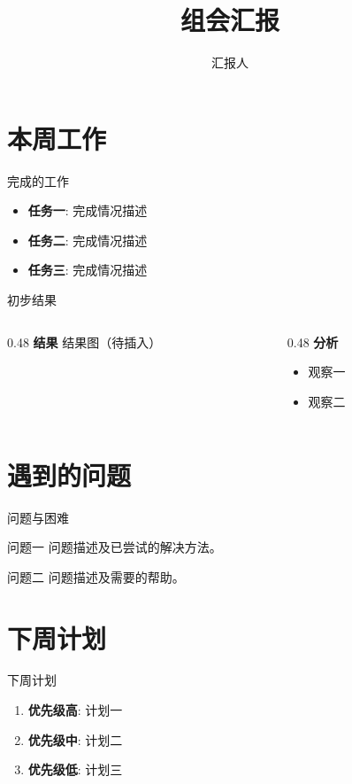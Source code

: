 \documentclass[
    aspectratio=169,
    fontset=windows,
]{ctexbeamer}
\title{组会汇报}
\author{汇报人}
\begin{document}
\maketitle

\section{本周工作}

\begin{frame}{完成的工作}
  \begin{itemize}
    \item \textbf{任务一}: 完成情况描述
    \item \textbf{任务二}: 完成情况描述
    \item \textbf{任务三}: 完成情况描述
  \end{itemize}
\end{frame}

\begin{frame}{初步结果}
  \begin{columns}[T]
    \begin{column}{0.48\textwidth}
      \textbf{结果}
      结果图（待插入）
    \end{column}
    \begin{column}{0.48\textwidth}
      \textbf{分析}
      \begin{itemize}
        \item 观察一
        \item 观察二
      \end{itemize}
    \end{column}
  \end{columns}
\end{frame}

\section{遇到的问题}

\begin{frame}{问题与困难}
  \begin{alertblock}{问题一}
    问题描述及已尝试的解决方法。
  \end{alertblock}

  \begin{alertblock}{问题二}
    问题描述及需要的帮助。
  \end{alertblock}
\end{frame}

\section{下周计划}

\begin{frame}{下周计划}
  \begin{enumerate}
    \item \textbf{优先级高}: 计划一
    \item \textbf{优先级中}: 计划二
    \item \textbf{优先级低}: 计划三
  \end{enumerate}
\end{frame}

\maketitle
\end{document}

